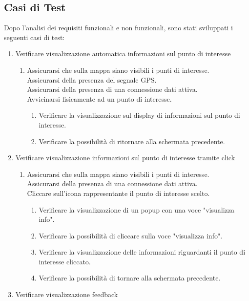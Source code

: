 \subsection{Casi di Test}
Dopo l'analisi dei requisiti funzionali e non funzionali, sono stati sviluppati i seguenti casi di test:
\begin{enumerate}
\item Verificare visualizzazione automatica informazioni sul punto di interesse
\begin{enumerate}
\item Assicurarsi che sulla mappa siano visibili i punti di interesse.\\
Assicurarsi della presenza del segnale GPS.\\
Assicurarsi della presenza di una connessione dati attiva.\\
Avvicinarsi fisicamente ad un punto di interesse.\\
\begin{enumerate}
\item Verificare la visualizzazione sul display di informazioni sul punto di interesse.
\item Verificare la possibilità di ritornare alla schermata precedente.
\end{enumerate}
\end{enumerate}
\item Verificare visualizzazione informazioni sul punto di interesse tramite click
\begin{enumerate}
\item Assicurarsi che sulla mappa siano visibili i punti di interesse.\\
Assicurarsi della presenza di una connessione dati attiva.\\
Cliccare sull'icona rappresentante il punto di interesse scelto.
\begin{enumerate}
\item Verificare la visualizzazione di un popup con una voce "visualizza info".
\item Verificare la possibilità di cliccare sulla voce "visualizza info".
\item Verificare la visualizzazione delle informazioni riguardanti il punto di interesse cliccato.
\item Verificare la possibilità di tornare alla schermata precedente.
\end{enumerate}
\end{enumerate}
\item Verificare visualizzazione feedback

\end{enumerate}

